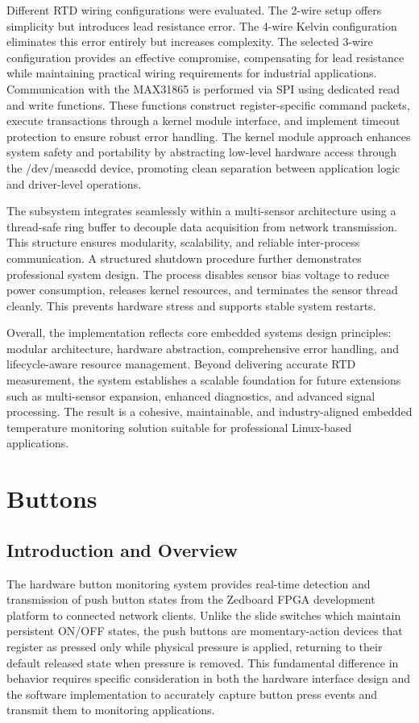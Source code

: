 Different RTD wiring configurations were evaluated. The 2-wire setup offers simplicity but introduces lead resistance error. The 4-wire Kelvin configuration eliminates this error entirely but increases complexity. The selected 3-wire configuration provides an effective compromise, compensating for lead resistance while maintaining practical wiring requirements for industrial applications.
Communication with the MAX31865 is performed via SPI using dedicated read and write functions. These functions construct register-specific command packets, execute transactions through a kernel module interface, and implement timeout protection to ensure robust error handling. The kernel module approach enhances system safety and portability by abstracting low-level hardware access through the /dev/meascdd device, promoting clean separation between application logic and driver-level operations.

The subsystem integrates seamlessly within a multi-sensor architecture using a thread-safe ring buffer to decouple data acquisition from network transmission. This structure ensures modularity, scalability, and reliable inter-process communication.
A structured shutdown procedure further demonstrates professional system design. The process disables sensor bias voltage to reduce power consumption, releases kernel resources, and terminates the sensor thread cleanly. This prevents hardware stress and supports stable system restarts.

Overall, the implementation reflects core embedded systems design principles: modular architecture, hardware abstraction, comprehensive error handling, and lifecycle-aware resource management. Beyond delivering accurate RTD measurement, the system establishes a scalable foundation for future extensions such as multi-sensor expansion, enhanced diagnostics, and advanced signal processing.
The result is a cohesive, maintainable, and industry-aligned embedded temperature monitoring solution suitable for professional Linux-based applications.



\section{Buttons}
\subsection{Introduction and Overview}
The hardware button monitoring system provides real-time detection and transmission of push button states from the Zedboard FPGA development platform to connected network clients. Unlike the slide switches which maintain persistent ON/OFF states, the push buttons are momentary-action devices that register as pressed only while physical pressure is applied, returning to their default released state when pressure is removed. This fundamental difference in behavior requires specific consideration in both the hardware interface design and the software implementation to accurately capture button press events and transmit them to monitoring applications.

